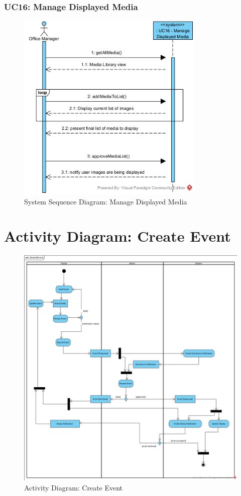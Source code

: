 \documentclass{article}
\begin{document}
\subsubsection{UC16: Manage Displayed Media}
\begin{figure}[H]
    \centering
    \includegraphics[width=0.8\textwidth]{images/SSD-UC16-ManageDisplayedMedia.png}
    \centering
    \caption{System Sequence Diagram: Manage Displayed Media}
\end{figure}

\section{Activity Diagram: Create Event}
\begin{figure}[H]
    \centering
    \includegraphics[width=.98\textwidth]{images/SubmitEvent.png}
    \centering
    \caption{Activity Diagram: Create Event}
    \label{fig:activityDiagram}
\end{figure}
\end{document}
